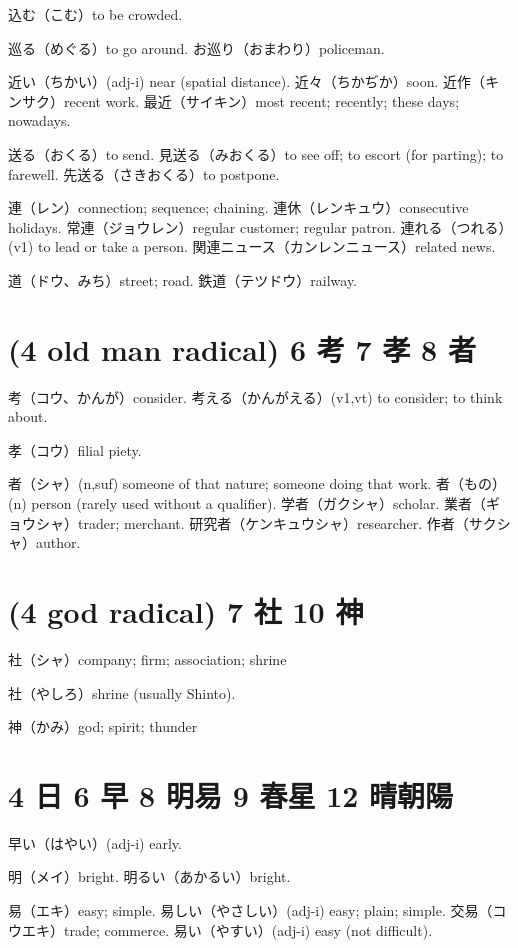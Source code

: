 込む（こむ）to be crowded.

巡る（めぐる）to go around.
お巡り（おまわり）policeman.

近い（ちかい）(adj-i) near (spatial distance).
近々（ちかぢか）soon.
近作（キンサク）recent work.
最近（サイキン）most recent; recently; these days; nowadays.

送る（おくる）to send.
見送る（みおくる）to see off; to escort (for parting); to farewell.
先送る（さきおくる）to postpone.

連（レン）connection; sequence; chaining.
連休（レンキュウ）consecutive holidays.
常連（ジョウレン）regular customer; regular patron.
連れる（つれる）(v1) to lead or take a person.
関連ニュース（カンレンニュース）related news.

道（ドウ、みち）street; road.
鉄道（テツドウ）railway.

\section{(4 old man radical) 6 考 7 孝 8 者}

考（コウ、かんが）consider.
考える（かんがえる）(v1,vt) to consider; to think about.

孝（コウ）filial piety.

者（シャ）(n,suf) someone of that nature; someone doing that work.
者（もの）(n) person (rarely used without a qualifier).
学者（ガクシャ）scholar.
業者（ギョウシャ）trader; merchant.
研究者（ケンキュウシャ）researcher.
作者（サクシャ）author.

\section{(4 god radical) 7 社 10 神}

社（シャ）company; firm; association; shrine

社（やしろ）shrine (usually Shinto).

神（かみ）god; spirit; thunder

\section{4 日 6 早 8 明易 9 春星 12 晴朝陽}

早い（はやい）(adj-i) early.

明（メイ）bright.
明るい（あかるい）bright.

易（エキ）easy; simple.
易しい（やさしい）(adj-i) easy; plain; simple.
交易（コウエキ）trade; commerce.
易い（やすい）(adj-i) easy (not difficult).

